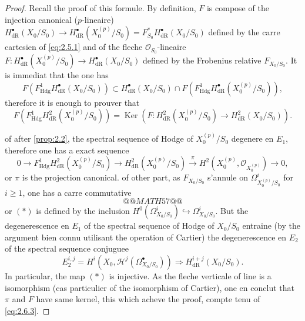 \documentclass[12pt,a4paper]{article}
\theoremstyle{plain}
\theoremstyle{definition}
\theoremstyle{remark}
\DeclareMathOperator{\Ker}{Ker}
\newcommand{\Hdg}{\mathrm{Hdg}}
\begin{document}
\begin{proof}
Recall the proof of this formule. By definition, $F$ is compose of the injection canonical ($p$-lineaire) $H^{\bullet}_{\mathrm{dR}}(X_0/S_0) \to H^{\bullet}_{\mathrm{dR}}(X_0^{(p)}/S_0) = F_{S_0}^* H^{\bullet}_{\mathrm{dR}}(X_0/S_0)$ defined by the carre cartesien of \eqref{eq:2.5.1} and of the fleche $\mathcal{O}_{S_0}$-lineaire $F: H^{\bullet}_{\mathrm{dR}}(X_0^{(p)}/S_0) \to H^{\bullet}_{\mathrm{dR}}(X_0/S_0)$ defined by the Frobenius relative $F_{X_0/S_0}$. It is immediat that the one has
\[
F(F^1_{\Hdg} H^{\bullet}_{\mathrm{dR}}(X_0/S_0)) \subset H^{\bullet}_{\mathrm{dR}}(X_0/S_0) \cap F(F^1_{\Hdg} H^{\bullet}_{\mathrm{dR}}(X_0^{(p)}/S_0)),
\]
therefore it is enough to prouver that
\begin{equation}\label{eq:2.6.2}
F(F^1_{\Hdg} H^2_{\mathrm{dR}}(X_0^{(p)}/S_0)) = \Ker(F: H^2_{\mathrm{dR}}(X_0^{(p)}/S_0) \to H^2_{\mathrm{dR}}(X_0/S_0)).
\end{equation}

of after \ref{prop:2.2}, the spectral sequence of Hodge of $X_0^{(p)}/S_0$ degenere en $E_1$, therefore one has a exact sequence
\begin{equation}\label{eq:2.6.3}
0 \to F^1_{\Hdg} H^2_{\mathrm{dR}}(X_0^{(p)}/S_0) \to H^2_{\mathrm{dR}}(X_0^{(p)}/S_0) \xrightarrow{\pi} H^2(X_0^{(p)}, \mathcal{O}_{X_0^{(p)}}) \to 0,
\end{equation}
or $\pi$ is the projection canonical. of other part, as $F_{X_0/S_0}$ s'annule on $\Omega^i_{X_0^{(p)}/S_0}$ for $i \geqslant 1$, one has a carre commutative
\[
@@MATH57@@
\]
or $(*)$ is defined by the inclusion $H^0(\Omega^i_{X_0/S_0}) \hookrightarrow \Omega^i_{X_0/S_0}$. But the degenerescence en $E_1$ of the spectral sequence of Hodge of $X_0/S_0$ entraine (by the argument bien connu utilisant the operation of Cartier) the degenerescence en $E_2$ of the spectral sequence conjuguee
\[
E_2^{i,j} = H^i(X_0, \mathcal{H}^j(\Omega^{\bullet}_{X_0/S_0})) \Rightarrow H^{i+j}_{\mathrm{dR}}(X_0/S_0).
\]
In particular, the map $(*)$ is injective. As the fleche verticale of line is a isomorphism (cas particulier of the isomorphism of Cartier), one en conclut that $\pi$ and $F$ have same kernel, this which acheve the proof, compte tenu of \eqref{eq:2.6.3}.
\end{proof}
\end{document}
